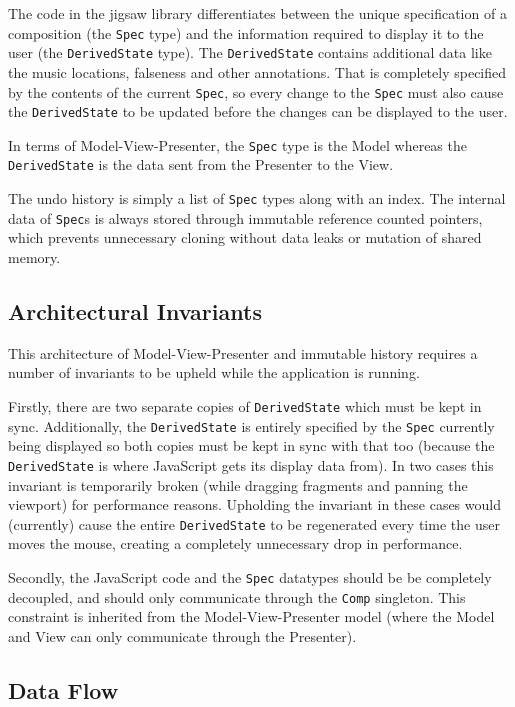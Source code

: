\documentclass[12pt]{article}
\begin{document}
The code in the jigsaw library differentiates between the unique specification of a composition
(the \verb|Spec| type) and the information required to display it to the user (the
\verb|DerivedState| type).  The \verb|DerivedState| contains additional data like the music
locations, falseness and other annotations.  That is completely specified by the contents of the
current \verb|Spec|, so every change to the \verb|Spec| must also cause the \verb|DerivedState| to
be updated before the changes can be displayed to the user.

In terms of Model-View-Presenter, the \verb|Spec| type is the Model whereas the \verb|DerivedState|
is the data sent from the Presenter to the View.

The undo history is simply a list of \verb|Spec| types along with an index.  The internal data of
\verb|Spec|s is always stored through immutable reference counted pointers, which prevents
unnecessary cloning without data leaks or mutation of shared memory.

\subsection{Architectural Invariants}

This architecture of Model-View-Presenter and immutable history requires a number of invariants to
be upheld while the application is running.

Firstly, there are two separate copies of \verb|DerivedState| which must be kept in sync.
Additionally, the \verb|DerivedState| is entirely specified by the \verb|Spec| currently being
displayed so both copies must be kept in sync with that too (because the \verb|DerivedState| is
where JavaScript gets its display data from).  In two cases this invariant is temporarily broken
(while dragging fragments and panning the viewport) for performance reasons.  Upholding the
invariant in these cases would (currently) cause the entire \verb|DerivedState| to be regenerated
every time the user moves the mouse, creating a completely unnecessary drop in performance.

Secondly, the JavaScript code and the \verb|Spec| datatypes should be be completely decoupled, and
should only communicate through the \verb|Comp| singleton.  This constraint is inherited from the
Model-View-Presenter model (where the Model and View can only communicate through the Presenter).

\subsection{Data Flow}
\end{document}
